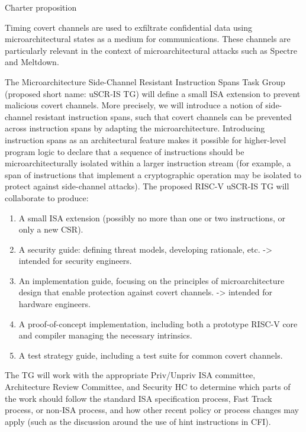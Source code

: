 \documentclass[11pt]{beamer}
\begin{document}
\begin{frame}[allowframebreaks]{Charter proposition}
 
        \begin{small}
Timing covert channels are used to exfiltrate confidential data using microarchitectural states as a medium for communications. These channels are particularly relevant in the context of microarchitectural attacks such as Spectre and Meltdown.

The Microarchitecture Side-Channel Resistant Instruction Spans Task Group (proposed short name: uSCR-IS TG) will define a small ISA extension to prevent malicious covert channels. More precisely, we will introduce a notion of side-channel resistant instruction spans, such that covert channels can be prevented across instruction spans by adapting the microarchitecture. Introducing instruction spans as an architectural feature makes it possible for higher-level program logic to declare that a sequence of instructions should be microarchitecturally isolated within a larger instruction stream (for example, a span of instructions that implement a cryptographic operation may be isolated to protect against side-channel attacks). The proposed RISC-V uSCR-IS TG will collaborate to produce:

\begin{enumerate}
\item A small ISA extension (possibly no more than one or two instructions, or only a new CSR).
\item A security guide: defining threat models, developing rationale, etc. -> intended for security engineers.
\item An implementation guide, focusing on the principles of microarchitecture design that enable protection against covert channels. -> intended for hardware engineers.
\item A proof-of-concept implementation, including both a prototype RISC-V core and compiler managing the necessary intrinsics.
\item A test strategy guide, including a test suite for common covert channels.
\end{enumerate}
The TG will work with the appropriate Priv/Unpriv ISA committee, Architecture Review Committee, and Security HC to determine which parts of the work should follow the standard ISA specification process, Fast Track process, or non-ISA process, and how other recent policy or process changes may apply (such as the discussion around the use of hint instructions in CFI).

        \end{small}

\end{frame}
\end{document}
